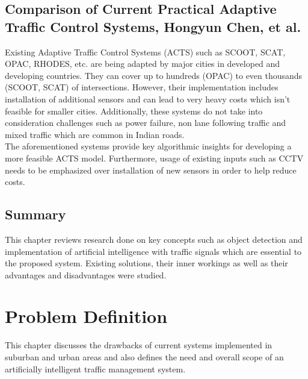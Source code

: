 \documentclass[openany,12pt]{report}
\begin{document}
	\section{Comparison of Current Practical Adaptive Traffic Control Systems, Hongyun Chen, et al. \cite{paper4}}
	\hspace*{0.5in}Existing Adaptive Traffic Control Systems (ACTS) such as SCOOT, SCAT, OPAC, RHODES, etc. are being adapted by major cities in developed and developing countries. They can cover up to hundreds (OPAC) to even thousands (SCOOT, SCAT) of intersections. However, their implementation includes installation of additional sensors and can lead to very heavy costs which isn't feasible for smaller cities. Additionally, these systems do not take into consideration challenges such as power failure, non lane following traffic and mixed traffic which are common in Indian roads.\\
	\hspace*{0.5in}The aforementioned systems provide key algorithmic insights for developing a more feasible ACTS model. Furthermore, usage of existing inputs such as CCTV needs to be emphasized over installation of new sensors in order to help reduce costs.\\
	
	\section{Summary}
	\hspace*{0.5in}This chapter reviews research done on key concepts such as object detection and implementation of artificial intelligence with traffic signals which are essential to the proposed system. Existing solutions, their inner workings as well as their advantages and disadvantages were studied.\\
	
	
	
	\chapter{Problem Definition}
	
	\hspace*{0.5in}This chapter discusses the drawbacks of current systems implemented in suburban and urban areas and also defines the need and overall scope of an artificially intelligent traffic management system.\\
	
\end{document}
